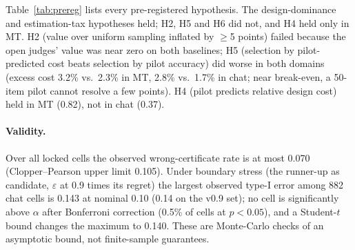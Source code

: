 \documentclass[11pt]{article}
\newcommand{\eps}{\varepsilon}
\newcommand{\Bp}{B_{\mathrm{pilot}}}
\begin{document}
Table~\ref{tab:prereg} lists every pre-registered hypothesis. The design-dominance and estimation-tax hypotheses held;
H2, H5 and H6 did not, and H4 held only in MT. H2 (value over uniform sampling inflated by $\ge$5 points) failed because the open judges' value was near zero on both
baselines; H5 (selection by pilot-predicted cost beats selection by pilot
accuracy) did worse in both domains (excess cost 3.2\% vs.\ 2.3\% in MT, 2.8\% vs.\ 1.7\% in chat; near break-even, a 50-item pilot cannot
resolve a few points). H4 (pilot predicts relative design cost) held in MT (0.82), not in chat (0.37).
\begin{table}[t]\centering\footnotesize\setlength{\tabcolsep}{2.5pt}
\caption{Pre-registered hypotheses (locks v0.8, v0.9, v1.1). $^a$Spearman over two-system menus. $^b$with the locked pilot-fixed
coefficient; with a refitted coefficient the post-hoc best of the eleven strong evaluators exceeds the design in 2/4 cells.
$^c$largely implied by the dilution factor $1-\Bp/J$. $^d$by the locked rule; in MT both correlations are near zero (0.07 vs.\ $-0.03$), so we read it as inconclusive there.
H7 and H2$'$ concern frontier judges and are recorded in Appendix~\ref{app:prereg}.}\label{tab:prereg}
\end{table}
\paragraph{Validity.} Over all locked cells the observed wrong-certificate rate is at most 0.070 (Clopper--Pearson upper
limit 0.105). Under boundary stress (the runner-up as candidate, $\eps$ at 0.9 times its regret) the largest observed
type-I error among 882 chat cells is 0.143 at nominal 0.10 (0.14 on the v0.9 set); no cell is significantly above
$\alpha$ after Bonferroni correction (0.5\% of cells at $p<0.05$), and a Student-$t$ bound changes the maximum to 0.140.
These are Monte-Carlo checks of an asymptotic bound, not finite-sample guarantees.
\end{document}
